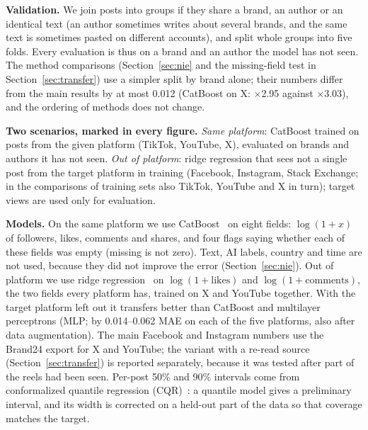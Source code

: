 \documentclass[10pt,a4paper]{article}
\newcommand{\x}[1]{$\times$#1}
\begin{document}
\textbf{Validation.} We join posts into groups if they share a brand, an author or an identical text (an author
sometimes writes about several brands, and the same text is sometimes pasted on different accounts), and split whole
groups into five folds. Every evaluation is thus on a brand and an author the model has not seen. The method comparisons (Section~\ref{sec:nie} and the missing-field test in Section~\ref{sec:transfer}) use a simpler split by brand alone; their numbers differ from the main results by at most 0.012 (CatBoost on X: \x{2.95} against \x{3.03}), and the ordering of methods does not
change.

\begin{tcolorbox}[colback=black!3,colframe=black!25,boxrule=.4pt,left=4pt,right=4pt,top=2pt,bottom=2pt]\small
\textbf{Two scenarios, marked in every figure.} \emph{Same platform}: CatBoost trained on posts from the given platform
(TikTok, YouTube, X), evaluated on brands and authors it has not seen. \emph{Out of platform}: ridge regression that sees
not a single post from the target platform in training (Facebook, Instagram, Stack Exchange; in the comparisons of training sets also TikTok, YouTube and X in turn); target views are used only for
evaluation.
\end{tcolorbox}

\textbf{Models.} On the same platform we use CatBoost~\cite{catboost} on eight fields: $\log(1+x)$ of followers, likes,
comments and shares, and four flags saying whether each of these fields was empty (missing is not zero). Text, AI labels,
country and time are not used, because they did not improve the error (Section~\ref{sec:nie}). Out of platform we use ridge
regression~\cite{hoerl1970} on $\log(1+\text{likes})$ and $\log(1+\text{comments})$, the two fields every platform has,
trained on X and YouTube together. With the target platform left out it transfers better than CatBoost and multilayer perceptrons (MLP; by
0.014--0.062 MAE on each of the five platforms, also after data augmentation). The main Facebook and Instagram numbers
use the Brand24 export for X and YouTube; the variant with a re-read source (Section~\ref{sec:transfer}) is reported
separately, because it was tested after part of the reels had been seen. Per-post 50\% and 90\% intervals come from
conformalized quantile regression (CQR)~\cite{romano2019}: a quantile model gives a preliminary interval, and its width
is corrected on a held-out part of the data so that coverage matches the target.
\end{document}
